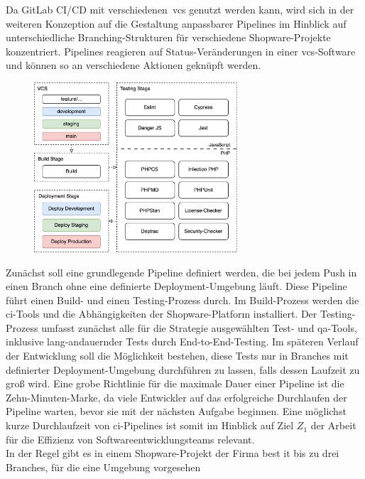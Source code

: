 Da GitLab CI/CD mit verschiedenen\ \acrshort{vcs} genutzt werden kann, wird sich in der weiteren Konzeption auf die
Gestaltung anpassbarer Pipelines im Hinblick auf unterschiedliche Branching-Strukturen für verschiedene
Shopware-Projekte konzentriert.
Pipelines reagieren auf Status-Veränderungen in einer \acrshort{vcs}-Software und können so an verschiedene
Aktionen geknüpft werden.
\begin{figure}
    \centering
    \includegraphics[width=0.675\textwidth]{images/content/ci-pipeline-concept}
    \label{fig:ci-pipeline-concept}
\end{figure}
Zunächst soll eine grundlegende Pipeline definiert werden, die bei jedem Push in einen Branch ohne eine definierte
Deployment-Umgebung läuft.
Diese Pipeline führt einen Build- und einen Testing-Prozess durch.
Im Build-Prozess werden die \acrshort{ci}-Tools und die Abhängigkeiten der Shopware-Platform installiert.
Der Testing-Prozess umfasst zunächst alle für die Strategie ausgewählten Test- und \acrshort{qa}-Tools, inklusive
lang-andauernder Tests durch End-to-End-Testing.
Im späteren Verlauf der Entwicklung soll die Möglichkeit bestehen, diese Tests nur in Branches mit definierter
Deployment-Umgebung durchführen zu lassen, falls dessen Laufzeit zu groß wird.
Eine grobe Richtlinie für die maximale Dauer einer Pipeline ist die Zehn-Minuten-Marke, da viele Entwickler
auf das erfolgreiche Durchlaufen der Pipeline warten, bevor sie mit der nächsten Aufgabe beginnen.
Eine möglichst kurze Durchlaufzeit von \acrshort{ci}-Pipelines ist somit im Hinblick auf Ziel $Z_1$ der Arbeit für die
Effizienz von Softwareentwicklungsteams relevant.\\
In der Regel gibt es in einem Shopware-Projekt der Firma best it bis zu drei Branches, für die eine Umgebung vorgesehen
